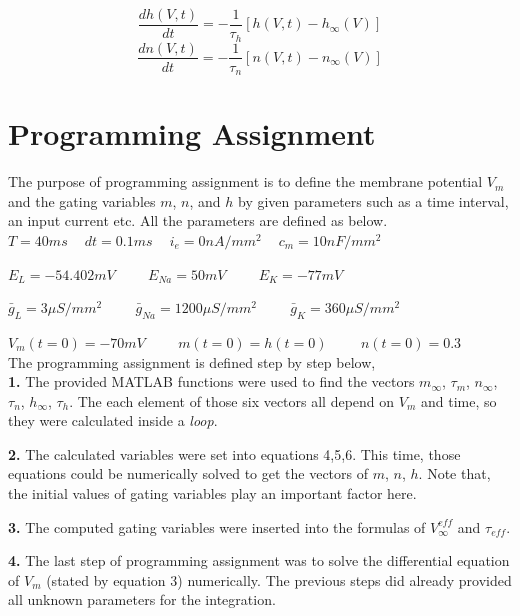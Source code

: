 \documentclass{article}
\begin{document}
\begin{equation}
 \frac{dh(V,t)}{dt}=-\frac{1}{\tau_{h}}[h(V,t)-h_{\infty}(V)]
\end{equation}
\begin{equation}
 \frac{dn(V,t)}{dt}=-\frac{1}{\tau_{n}}[n(V,t)-n_{\infty}(V)]
\end{equation}

 \section{Programming Assignment}

The purpose of programming assignment is to define the membrane potential $V_{m}$ and the gating variables $m$, $n$, and $h$ by given parameters such as a time interval, an input current etc. All the  parameters are defined as below. \\

$
T=40 ms\,\,\,\,\,\,\ dt=0.1 ms\,\,\,\,\,\,\ i_{e}=0 nA/mm^2 \,\,\,\,\,\,\ c_{m}=10 nF/mm^2 $


$
E_{L}=-54.402 mV\,\,\,\,\,\,\,\,\,\,\,\,\,\ E_{Na}=50 mV \,\,\,\,\,\,\,\,\,\,\,\,\,\ E_{K}=-77 mV \,\,\,\,\,\,\  $

$
\bar{g}_{L}=3 \mu S/mm^{2}\,\,\,\,\,\,\,\,\,\,\,\,\,\ \bar{g}_{Na}=1200 \mu S/mm^{2}\,\,\,\,\,\,\,\,\,\,\,\,\,\ \bar{g}_{K}=360 \mu S/mm^2 \,\,\,\,\,\,\  $

$ V_{m}(t=0)=-70 mV \,\,\,\,\,\,\,\,\,\,\,\,\,\ m(t=0)=h(t=0)\,\,\,\,\,\,\,\,\,\,\,\,\,\ n(t=0)=0.3$ \\ 

The programming assignment is defined step by step below,\\

\setcounter{tocdepth}{1}
\textbf{1.} The provided MATLAB functions were used to find the vectors $m_{\infty}$, $\tau_{m}$, $n_{\infty}$, $\tau_{n}$, $h_{\infty}$, $\tau_{h}$. The each element of those six vectors all depend on $V_{m}$ and time, so they were calculated inside a \textit{loop}.

\setcounter{tocdepth}{1}
\textbf{2.} The calculated variables were set into equations 4,5,6. This time, those equations could be numerically solved to get the vectors of $m$, $n$, $h$. Note that, the initial values of gating variables play an important factor here. 

\setcounter{tocdepth}{1}
\textbf{3.} The computed gating variables were inserted into the formulas of $V_{\infty}^{eff}$ and $\tau_{eff}$.

\setcounter{tocdepth}{1}
\textbf{4.} The last step of programming assignment was to solve the differential equation of $V_{m}$ (stated by equation 3) numerically. The previous steps did already provided all unknown parameters for the integration.\\
\end{document}
